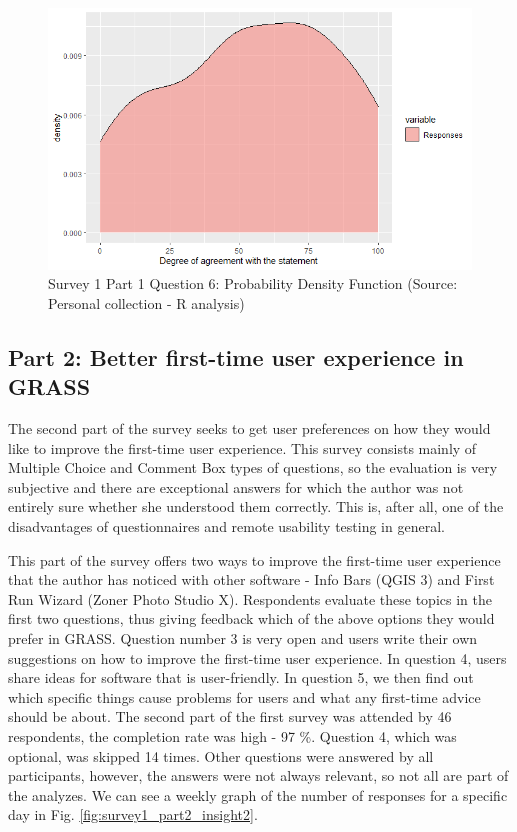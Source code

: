 \documentclass[a4paper,10pt,twoside]{article}
\begin{document}
\vspace{0.3cm}
\begin{figure}[hbt!] 
\begin{center}
\includegraphics[width=15cm]{../surveys/analyzed_data/survey1_part1_question6_r_pdf.png} 
\caption[Survey 1 Part 1 Question 6: Probability Density Function]{Survey 1 Part 1 Question 6: Probability Density Function (Source: Personal collection - R analysis)}
\label{fig:survey1_part1_question6_r_pdf}
\end{center}
\end{figure}


\newpage
\vspace*{-1cm}
\subsection{Part 2: Better first-time user experience in GRASS}

\noindent The second part of the survey seeks to get user preferences on how they would like to improve the first-time user experience. This survey consists mainly of Multiple Choice and Comment Box types of questions, so the evaluation is very subjective and there are exceptional answers for which the author was not entirely sure whether she understood them correctly. This is, after all, one of the disadvantages of questionnaires and remote usability testing in general.

This part of the survey offers two ways to improve the first-time user experience that the author has noticed with other software - Info Bars (QGIS 3) and First Run Wizard (Zoner Photo Studio X). Respondents evaluate these topics in the first two questions, thus giving feedback which of the above options they would prefer in GRASS. Question number 3 is very open and users write their own suggestions on how to improve the first-time user experience. In question 4, users share ideas for software that is user-friendly. In question 5, we then find out which specific things cause problems for users and what any first-time advice should be about. The second part of the first survey was attended by 46 respondents, the completion rate was high - 97 \%. Question 4, which was optional, was skipped 14 times. Other questions were answered by all participants, however, the answers were not always relevant, so not all are part of the analyzes. We can see a weekly graph of the number of responses for a specific day in Fig. \ref{fig:survey1_part2_insight2}.
\end{document}
